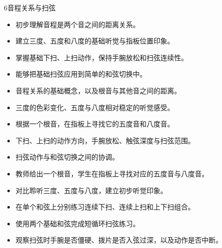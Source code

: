 \begin{lessoncard}{6}{音程关系与扫弦}
\begin{itemize}
\item 初步理解音程是两个音之间的距离关系。
\item 建立三度、五度和八度的基础听觉与指板位置印象。
\item 掌握基础下扫、上扫动作，保持手腕放松和扫弦连续性。
\item 能够把基础扫弦应用到简单的和弦切换中。
\end{itemize}
\begin{itemize}
\item 音程关系的基础概念，以及根音与其他音之间的距离。
\item 三度的色彩变化、五度与八度相对稳定的听觉感受。
\item 根据一个根音，在指板上寻找它的五度音和八度音。
\item 下扫、上扫的动作方向，手腕放松、触弦深度与扫弦范围。
\item 扫弦动作与和弦切换之间的协调。
\end{itemize}
\begin{itemize}
\item 教师给出一个根音，学生在指板上寻找对应的五度音与八度音。
\item 对比聆听三度、五度与八度，建立初步听觉印象。
\item 在单个和弦上分别练习连续下扫、连续上扫和上下扫组合。
\item 使用两个基础和弦完成短循环扫弦练习。
\item 观察扫弦时手腕是否僵硬、拨片是否入弦过深，以及动作是否中断。
\end{itemize}
\begin{fignote}
\begin{center}
\hspace{16mm}%
\end{center}
\end{fignote}
\end{lessoncard}
